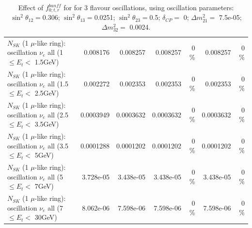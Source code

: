 \begin{table}
\begin{tabular}{| l | r | r | r  r | r  r |}
$N_{SK}$ (1 $\mu$-like ring): oscillation $\nu_{e}$ all (1 $\leq E_{t} <$ 1.5GeV) &        0.008176 &        0.008257 &        0.008257 &        0 \%  &        0.008257 &        0 \%  \\ 
$N_{SK}$ (1 $\mu$-like ring): oscillation $\nu_{e}$ all (1.5 $\leq E_{t} <$ 2.5GeV) &        0.002272 &        0.002353 &        0.002353 &        0 \%  &        0.002353 &        0 \%  \\ 
$N_{SK}$ (1 $\mu$-like ring): oscillation $\nu_{e}$ all (2.5 $\leq E_{t} <$ 3.5GeV) &       0.0003949 &       0.0003632 &       0.0003632 &        0 \%  &       0.0003632 &        0 \%  \\ 
$N_{SK}$ (1 $\mu$-like ring): oscillation $\nu_{e}$ all (3.5 $\leq E_{t} <$ 5GeV) &       0.0001288 &       0.0001202 &       0.0001202 &        0 \%  &       0.0001202 &        0 \%  \\ 
 $N_{SK}$ (1 $\mu$-like ring): oscillation $\nu_{e}$ all (5 $\leq E_{t} <$ 7GeV) &       3.728e-05 &       3.438e-05 &       3.438e-05 &        0 \%  &       3.438e-05 &        0 \%  \\ 
$N_{SK}$ (1 $\mu$-like ring): oscillation $\nu_{e}$ all (7 $\leq E_{t} <$ 30GeV) &       8.062e-06 &       7.598e-06 &       7.598e-06 &        0 \%  &       7.598e-06 &        0 \%  \\ 
\hline
\hline
\end{tabular}
\caption{ Effect of $f_{0; t, r}^{banff}$ for for 3 flavour oscillations, using oscillation parameters:  $\sin^2\theta_{12} = $0.306; $\sin^2\theta_{13} = $0.0251; $\sin^2\theta_{23} = $0.5; $\delta_{CP} = $        0; $\Delta m^2_{21} = $    7.5e-05; $\Delta m^2_{32} = $    0.0024. }
\label{tab:num_banff_00_1RmuT_3f_osc_t13:0.0251}
\end{table}
\clearpage
